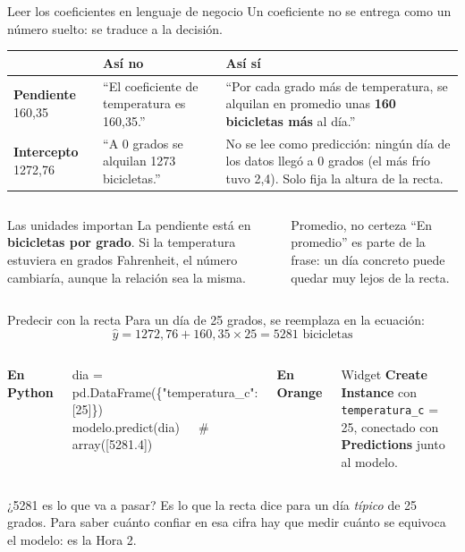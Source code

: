 \documentclass[aspectratio=169,11pt]{beamer}
\newcommand{\codigo}[1]{\par\smallskip\noindent\colorbox{esumerGray!70}{\parbox{\dimexpr\linewidth-2\fboxsep\relax}{\scriptsize\ttfamily #1}}\par\smallskip}
\begin{document}
\begin{frame}[t]{Leer los coeficientes en lenguaje de negocio}
  \small
  Un coeficiente no se entrega como un número suelto: se traduce a la
  decisión.
  \vspace{0.1cm}
  \footnotesize
  \renewcommand{\arraystretch}{1.3}
  \begin{tabular}{@{}L{2.5cm}L{4.5cm}L{6.1cm}@{}}
    \toprule
    & \textbf{Así no} & \textbf{Así sí} \\
    \midrule
    \textbf{Pendiente} 160,35 & ``El coeficiente de temperatura es 160,35.'' & ``Por cada grado más de temperatura, se alquilan en promedio unas \textbf{160 bicicletas más} al día.'' \\
    \textbf{Intercepto} 1272,76 & ``A 0 grados se alquilan 1273 bicicletas.'' & No se lee como predicción: ningún día de los datos llegó a 0 grados (el más frío tuvo 2,4). Solo fija la altura de la recta. \\
    \bottomrule
  \end{tabular}
  \vspace{0.2cm}
  \begin{columns}[T,onlytextwidth]
    \begin{block}{Las unidades importan}
      \footnotesize La pendiente está en \textbf{bicicletas por grado}. Si
      la temperatura estuviera en grados Fahrenheit, el número cambiaría,
      aunque la relación sea la misma.
    \end{block}
    \begin{alertblock}{Promedio, no certeza}
      \footnotesize ``En promedio'' es parte de la frase: un día concreto
      puede quedar muy lejos de la recta.
    \end{alertblock}
  \end{columns}
\end{frame}

\begin{frame}[t]{Predecir con la recta}
  \small
  Para un día de 25 grados, se reemplaza en la ecuación:
  \[ \hat{y} = 1272{,}76 + 160{,}35 \times 25 = 5281 \text{ bicicletas} \]
  \begin{columns}[T,onlytextwidth]
    \footnotesize\textbf{En Python}
    \codigo{dia = pd.DataFrame(\{"temperatura\_c": [25]\})\\
      modelo.predict(dia)\ \ \ \# array([5281.4])}
    \footnotesize\textbf{En Orange}
    \par\smallskip
    \footnotesize Widget \textbf{Create Instance} con
    \texttt{temperatura\_c} = 25, conectado con \textbf{Predictions} junto
    al modelo.
  \end{columns}
  \vspace{0.15cm}
  \begin{alertblock}{¿5281 es lo que va a pasar?}
    \footnotesize Es lo que la recta dice para un día \emph{típico} de 25
    grados. Para saber cuánto confiar en esa cifra hay que medir cuánto se
    equivoca el modelo: es la Hora 2.
  \end{alertblock}
\end{frame}
\end{document}
